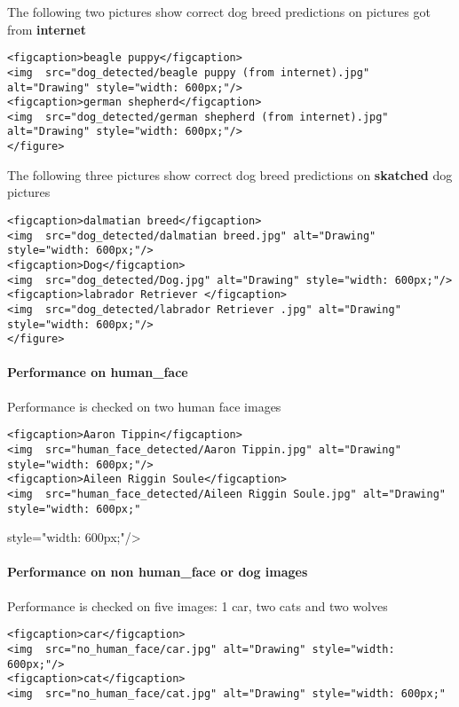 \documentclass[11pt]{article}
\begin{document}
The following two pictures show correct dog breed predictions on
pictures got from \textbf{internet}

\begin{verbatim}
<figcaption>beagle puppy</figcaption>
<img  src="dog_detected/beagle puppy (from internet).jpg" alt="Drawing" style="width: 600px;"/>
<figcaption>german shepherd</figcaption>
<img  src="dog_detected/german shepherd (from internet).jpg" alt="Drawing" style="width: 600px;"/>
</figure>    
\end{verbatim}

The following three pictures show correct dog breed predictions on
\textbf{skatched} dog pictures

\begin{verbatim}
<figcaption>dalmatian breed</figcaption>
<img  src="dog_detected/dalmatian breed.jpg" alt="Drawing" style="width: 600px;"/>
<figcaption>Dog</figcaption>
<img  src="dog_detected/Dog.jpg" alt="Drawing" style="width: 600px;"/>
<figcaption>labrador Retriever </figcaption>
<img  src="dog_detected/labrador Retriever .jpg" alt="Drawing" style="width: 600px;"/>    
</figure>  
\end{verbatim}

\paragraph{Performance on human\_face}\label{performance-on-human_face}

Performance is checked on two human face images

\begin{verbatim}
<figcaption>Aaron Tippin</figcaption>
<img  src="human_face_detected/Aaron Tippin.jpg" alt="Drawing" style="width: 600px;"/>
<figcaption>Aileen Riggin Soule</figcaption>
<img  src="human_face_detected/Aileen Riggin Soule.jpg" alt="Drawing" style="width: 600px;"
\end{verbatim}

style="width: 600px;"/\textgreater{}\\

\paragraph{Performance on non human\_face or dog
images}\label{performance-on-non-human_face-or-dog-images}

Performance is checked on five images: 1 car, two cats and two wolves

\begin{verbatim}
<figcaption>car</figcaption>
<img  src="no_human_face/car.jpg" alt="Drawing" style="width: 600px;"/>
<figcaption>cat</figcaption>
<img  src="no_human_face/cat.jpg" alt="Drawing" style="width: 600px;"
\end{verbatim}
\end{document}
